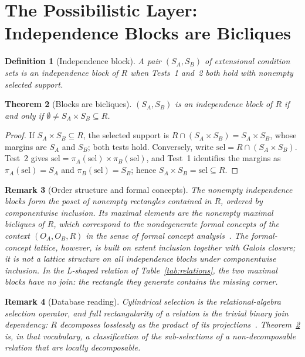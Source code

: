 \documentclass[11pt,a4paper]{article}
\newtheorem{theorem}{Theorem}[section]
\newtheorem{definition}[theorem]{Definition}
\newtheorem{remark}[theorem]{Remark}
\newcommand{\OA}{O_A}
\newcommand{\OB}{O_B}
\begin{document}
  \section{The Possibilistic Layer: Independence Blocks are Bicliques}
  \label{sec:possibilistic}

  \begin{definition}[Independence block]
    \label{def:block}
    A pair $(S_A, S_B)$ of extensional condition sets is an \emph{independence block} of $R$ when Tests~1
    and~2 both hold with nonempty selected support.
  \end{definition}

  \begin{theorem}[Blocks are bicliques]
    \label{thm:blocks}
    $(S_A, S_B)$ is an independence block of $R$ if and only if
    $\emptyset \neq S_A \times S_B \subseteq R$.
  \end{theorem}

  \begin{proof}
    If $S_A \times S_B \subseteq R$, the selected support is
    $R \cap (S_A \times S_B) = S_A \times S_B$, whose margins are $S_A$ and $S_B$; both tests hold.
    Conversely, write $\mathrm{sel} = R \cap (S_A \times S_B)$.
    Test~2 gives $\mathrm{sel} = \pi_A(\mathrm{sel}) \times \pi_B(\mathrm{sel})$, and Test~1 identifies the
    margins as $\pi_A(\mathrm{sel}) = S_A$ and $\pi_B(\mathrm{sel}) = S_B$; hence
    $S_A \times S_B = \mathrm{sel} \subseteq R$.
  \end{proof}

  \begin{remark}[Order structure and formal concepts]
    \label{rem:fca}
    The nonempty independence blocks form the poset of nonempty rectangles contained in $R$, ordered by
    componentwise inclusion.
    Its maximal elements are the nonempty maximal bicliques of $R$, which correspond to the nondegenerate
    formal concepts of the context $(\OA, \OB, R)$ in the sense of formal concept
    analysis~\cite{GanterWille1999}.
    The formal-concept lattice, however, is built on extent inclusion together with Galois closure; it is
    not a lattice structure on all independence blocks under componentwise inclusion.
    In the L-shaped relation of Table~\ref{tab:relations}, the two maximal blocks have no join: the
    rectangle they generate contains the missing corner.
  \end{remark}

  \begin{remark}[Database reading]
    \label{rem:database}
    Cylindrical selection is the relational-algebra selection operator, and full rectangularity of a
    relation is the trivial binary join dependency: $R$ decomposes losslessly as the product of its
    projections~\cite{Fagin1977}.
    Theorem~\ref{thm:blocks} is, in that vocabulary, a classification of the sub-selections of a
    non-decomposable relation that are locally decomposable.
  \end{remark}
\end{document}
